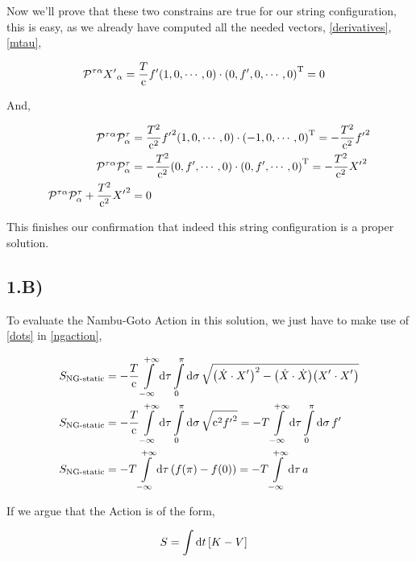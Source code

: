 Now we'll prove that these two constrains are true for our string configuration, this is easy, as we already have computed all the 
needed vectors, \ref{derivatives},\ref{mtau},

\begin{align*}
    \mathcal P^{\tau\alpha}{X'}_\alpha&=\frac{T}{\textnormal{c}}f'\qty(1,0,\cdots,0)\cdot{\qty(0,f',0,\cdots,0)}^{\textnormal{T}}=0
\end{align*}

And,

\begin{align*}
    \mathcal P^{\tau\alpha}\mathcal P^{\tau}_\alpha&=\frac{T^2}{\textnormal{c}^2}{f'}^2\qty(1,0,\cdots,0)\cdot{\qty(-1,0,\cdots,0)}^{\textnormal{T}}=-\frac{T^2}{\textnormal{c}^2}{f'}^2\\
    \mathcal P^{\tau\alpha}\mathcal P^{\tau}_\alpha&=-\frac{T^2}{\textnormal{c}^2}\qty(0,f',\cdots,0)\cdot{\qty(0,f',\cdots,0)}^{\textnormal{T}}=-\frac{T^2}{\textnormal{c}^2}{X'}^2\\
    \mathcal P^{\tau\alpha}\mathcal P^{\tau}_\alpha+\frac{T^2}{\textnormal{c}^2}{X'}^2&=0
\end{align*}

This finishes our confirmation that indeed this string configuration is a proper solution.

\subsection{1.B)}

To evaluate the Nambu-Goto Action in this solution, we just have to make use of \ref{dots} in \ref{ngaction},

\begin{align*}
    S_{\textnormal{NG-static}}&=-\frac{T}{\luz}\int\limits_{-\infty}^{+\infty}\dd{\tau}\int\limits_0^\pi\dd{\sigma}\sqrt{\qty(\dot X\cdot X^\sidev)^2- \qty(\dot X\cdot \dot X)\qty(X^\sidev\cdot X^\sidev) }\\
    S_{\textnormal{NG-static}}&=-\frac{T}{\luz}\int\limits_{-\infty}^{+\infty}\dd{\tau}\int\limits_0^\pi\dd{\sigma}\sqrt{\luz^2{f'}^2}=-T\int\limits_{-\infty}^{+\infty}\dd{\tau}\int\limits_0^\pi\dd{\sigma}f'\\
    S_{\textnormal{NG-static}}&=-T\int\limits_{-\infty}^{+\infty}\dd{\tau}\qty(f\qty(\pi)-f(0))=-T\int\limits_{-\infty}^{+\infty}\dd{\tau}a
\end{align*}

If we argue that the Action is of the form,

\begin{align*}
    S&=\int\dd{t}\qty[K-V]
\end{align*}

